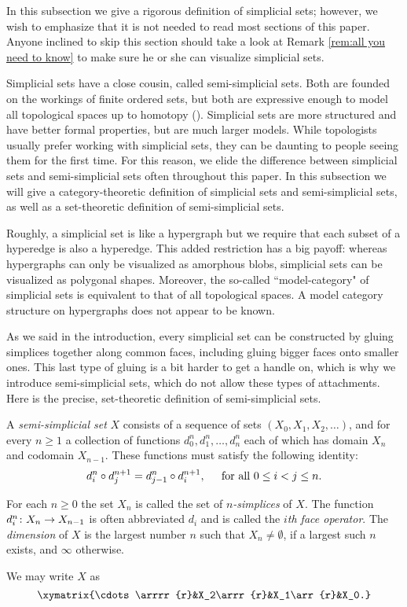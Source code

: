 \documentclass{amsart}
\begin{document}
In this subsection we give a rigorous definition of simplicial sets; however, we wish to emphasize that it is not needed to read most sections of this paper.  Anyone inclined to skip this section should take a look at Remark \ref{rem:all you need to know} to make sure he or she can visualize simplicial sets.

Simplicial sets have a close cousin, called semi-simplicial sets.  Both are founded on the workings of finite ordered sets, but both are expressive enough to model all topological spaces up to homotopy (\cite{}).  Simplicial sets are more structured and have better formal properties, but are much larger models.  While topologists usually prefer working with simplicial sets, they can be daunting to people seeing them for the first time.  For this reason, we elide the difference between simplicial sets and semi-simplicial sets often throughout this paper.   In this subsection we will give a category-theoretic definition of simplicial sets and semi-simplicial sets, as well as a set-theoretic definition of semi-simplicial sets. 

Roughly, a simplicial set is like a hypergraph but we require that each subset of a hyperedge is also a hyperedge.  This added restriction has a big payoff: whereas hypergraphs can only be visualized as amorphous blobs, simplicial sets can be visualized as polygonal shapes.  Moreover, the so-called ``model-category" of simplicial sets is equivalent to that of all topological spaces.  A model category structure on hypergraphs does not appear to be known.

As we said in the introduction, every simplicial set can be constructed by gluing simplices together along common faces, including gluing bigger faces onto smaller ones.  This last type of gluing is a bit harder to get a handle on, which is why we introduce semi-simplicial sets, which do not allow these types of attachments.  Here is the precise, set-theoretic definition of semi-simplicial sets.

\begin{definition}\label{def:set def of sset}

A {\em semi-simplicial set} $X$ consists of a sequence of sets $(X_0,X_1,X_2,\ldots)$, and for every $n\geq 1$ a collection of functions $d^n_0,d^n_1,\ldots,d^n_n$ each of which has domain $X_n$ and codomain $X_{n-1}$.  These functions must satisfy the following identity: $$d^n_i\circ d^{n+1}_j=d^n_{j-1}\circ d^{n+1}_i, \hspace{.2in} \textnormal{for all } 0\leq i<j\leq n.$$  

For each $n\geq 0$ the set $X_n$ is called the set of {\em $n$-simplices} of $X$.  The function $d^n_i\colon X_n\rightarrow X_{n-1}$ is often abbreviated $d_i$ and is called the {\em $i$th face operator}.  The {\em dimension} of $X$ is the largest number $n$ such that $X_n\neq\emptyset$, if a largest such $n$ exists, and $\infty$ otherwise.


We may write $X$ as $$\xymatrix{\cdots \arrrr{r}&X_2\arrr{r}&X_1\arr{r}&X_0.}$$

\end{definition}
\end{document}
